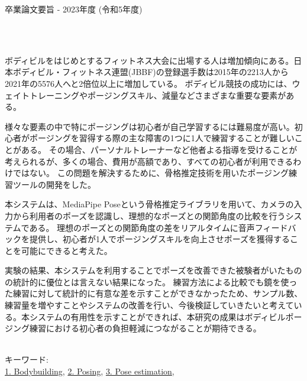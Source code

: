 卒業論文要旨 - 2023年度 (令和5年度)
\begin{center}
\begin{large}
\end{large}　
\end{center}

~ \\
  ボディビルをはじめとするフィットネス大会に出場する人は増加傾向にある。日本ボディビル・フィットネス連盟(JBBF)の登録選手数は2015年の2213人から2021年の5576人へと2倍位以上に増加している\cite{jbbf}。
  ボディビル競技の成功には、ウェイトトレーニングやポージングスキル、減量などさまざまな重要な要素がある。

  様々な要素の中で特にポージングは初心者が自己学習するには難易度が高い。初心者がポージングを習得する際の主な障害の1つに1人で練習することが難しいことがある。
  その場合、パーソナルトレーナーなど他者よる指導を受けることが考えられるが、多くの場合、費用が高額であり、すべての初心者が利用できるわけではない。
  この問題を解決するために、骨格推定技術を用いたポージング練習ツールの開発をした。

  本システムは、MediaPipe Poseという骨格推定ライブラリを用いて、カメラの入力から利用者のポーズを認識し、理想的なポーズとの関節角度の比較を行うシステムである。
  理想のポーズとの関節角度の差をリアルタイムに音声フィードバックを提供し、初心者が1人でポージングスキルを向上させポーズを獲得することを可能にできると考えた。

  実験の結果、本システムを利用することでポーズを改善できた被験者がいたものの統計的に優位とは言えない結果になった。
  練習方法による比較でも鏡を使った練習に対して統計的に有意な差を示すことができなかったため、サンプル数、練習量を増やすことやシステムの改善を行い、今後検証していきたいと考えている。本システムの有用性を示すことができれば、本研究の成果はボディビルポージング練習における初心者の負担軽減につながることが期待できる。

~ \\
キーワード:\\
\underline{1. Bodybuilding},
\underline{2. Posing},
\underline{3. Pose estimation},
\begin{flushright}
\dept \\
\author
\end{flushright}
